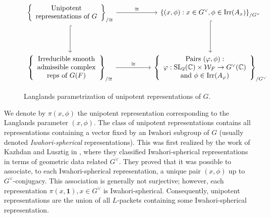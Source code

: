 \begin{figure}[ht!]
    \begin{displaymath}
        \begin{tikzcd}[column sep=5em, row sep=4em]
        \left\{ \begin{array}{c} 
            \text{Unipotent} \\ 
            \text{representations of } G 
        \end{array} \right\} _{\text{/}\cong}
        \arrow[r, "\cong"] 
        \arrow[d, hook] 
        &
        \left\{ (x, \phi) : x \in G^\vee, \phi \in \text{Irr}(A_x) \right\}_{\text{/}G^\vee}
        \arrow[d, hook] 
        \\
        \left\{ \begin{array}{c} 
            \text{Irreducible smooth} \\ 
            \text{admissible complex} \\ 
            \text{reps of } G(F) 
        \end{array} \right\} _{\text{/}\cong}
        \arrow[r, "\cong"] 
        & 
        \left\{ \begin{array}{c} 
            \text{Pairs }(\varphi,\phi): \\ 
            \varphi : \mathrm{SL}_2(\mathbb{C}) \times \mathcal{W}_F \to G^\vee(\mathbb{C})\\
            \text{and } \phi\in\Irr(A_\varphi)
        \end{array} \right\}_{\text{/}G^\vee}
        \end{tikzcd}
    \end{displaymath}
    \caption{Langlands parametrization of unipotent representations of $G$.}
    \label{fig:unipotent_reps}
\end{figure}
\newpage

We denote by $\pi(x,\phi)$ the unipotent representation corresponding to the Langlands parameter $(x,\phi)$.
The class of unipotent representations contains all representations containing a vector fixed by an Iwahori subgroup of $G$ (usually denoted \textit{Iwahori-spherical} representations). This was first realized by the work of Kazhdan and Lusztig in \cite{KazhdanLusztig1987}, where they classified Iwahori-spherical representations in terms of geometric data related $G^\vee$. They proved that it was possible to associate, to each Iwahori-spherical representation, a unique pair $(x,\phi)$ up to $G^\vee$-conjugacy. This association is generally not surjective; however, each representation $\pi(x,\mathbf{1}),x\in G^\vee$ is Iwahori-spherical. Consequently, unipotent representations are the union of all $L$-packets containing some Iwahori-spherical representation.


